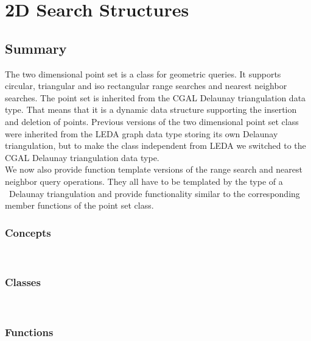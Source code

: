 

\ccParDims


\chapter{2D Search Structures}

\section*{Summary}

The two dimensional point set is a class for geometric queries.
It supports circular, triangular and iso rectangular range searches and
nearest neighbor searches.
The point set is inherited from the CGAL Delaunay triangulation data type.
That means that it is a dynamic data structure supporting the insertion and
deletion of points. Previous versions of the two dimensional point set class
were inherited from the LEDA graph data type storing its own Delaunay triangulation,
but to make the class independent from LEDA we switched to the 
CGAL Delaunay triangulation data type. \\
We now also provide function template versions of the range search and nearest
neighbor query operations. They all have to be templated by the type of a \cgal\
Delaunay triangulation and provide functionality similar to the corresponding
member functions of the point set class.

\subsection*{Concepts}
\\

\subsection*{Classes}
\\

\subsection*{Functions}
\\
\\
\\

